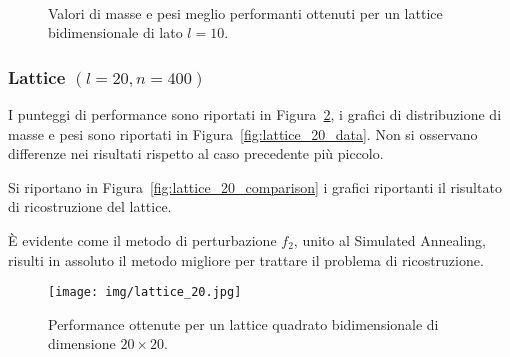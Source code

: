 \documentclass[10pt,a4paper]{article}
\begin{document}
\begin{figure}[p]
    \centering
    \\
    \caption{Valori di masse e pesi meglio performanti ottenuti per un lattice bidimensionale di lato \(l=10\).}\label{fig:lattice_10_data}
\end{figure}

\subsubsection{Lattice \((l = 20, n = 400)\)}

I punteggi di performance sono riportati in Figura~\ref{fig:lattice_20_performance}, i grafici di distribuzione di masse e pesi sono riportati in Figura~\ref{fig:lattice_20_data}.
Non si osservano differenze nei risultati rispetto al caso precedente più piccolo.

Si riportano in Figura~\ref{fig:lattice_20_comparison} i grafici riportanti il risultato di ricostruzione del lattice.

È evidente come il metodo di perturbazione \(f_2\), unito al Simulated Annealing, risulti in assoluto il metodo migliore per trattare il problema di ricostruzione.

\begin{figure}[p]
    \centering
    \texttt{[image: img/lattice\_20.jpg]}
    \caption{Performance ottenute per un lattice quadrato bidimensionale di dimensione \(20 \times 20\).}\label{fig:lattice_20_performance}
\end{figure}
\end{document}
